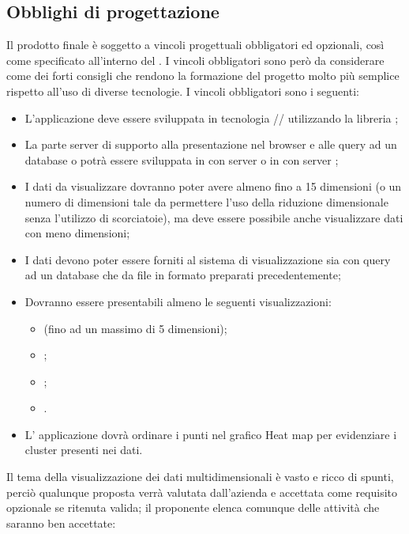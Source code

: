 \subsection{Obblighi di progettazione}
Il prodotto finale è soggetto a vincoli progettuali obbligatori ed opzionali, così come specificato all’interno del . I vincoli obbligatori sono però da considerare come dei forti consigli che rendono la formazione del progetto molto più semplice rispetto all'uso di diverse tecnologie.
I vincoli obbligatori sono i seguenti:
\begin{itemize}
	\item L'applicazione deve essere sviluppata in tecnologia // utilizzando la libreria ;
	\item La parte server di supporto alla presentazione nel browser e alle query ad un database  o  potrà essere sviluppata in  con server  o in  con server ;
	\item I dati da visualizzare dovranno poter avere almeno fino a 15 dimensioni (o un numero di dimensioni tale da permettere l'uso della riduzione dimensionale senza l'utilizzo di scorciatoie), ma deve essere possibile anche visualizzare dati con meno dimensioni;
	\item I dati devono poter essere forniti al sistema di visualizzazione sia con query ad un database che da file in formato  preparati precedentemente;
	\item Dovranno essere presentabili almeno le seguenti visualizzazioni:
	\begin{itemize}
		\item {} (fino ad un massimo di 5 dimensioni);
		\item {};
		\item {};
		\item {}.
	\end{itemize}
	\item L' applicazione dovrà ordinare i punti nel grafico Heat map per evidenziare i cluster presenti nei dati.
\end{itemize}
Il tema della visualizzazione dei dati multidimensionali è vasto e ricco di spunti, perciò qualunque proposta verrà valutata dall'azienda e accettata come requisito opzionale se ritenuta valida; il proponente elenca comunque delle attività che saranno ben accettate:
